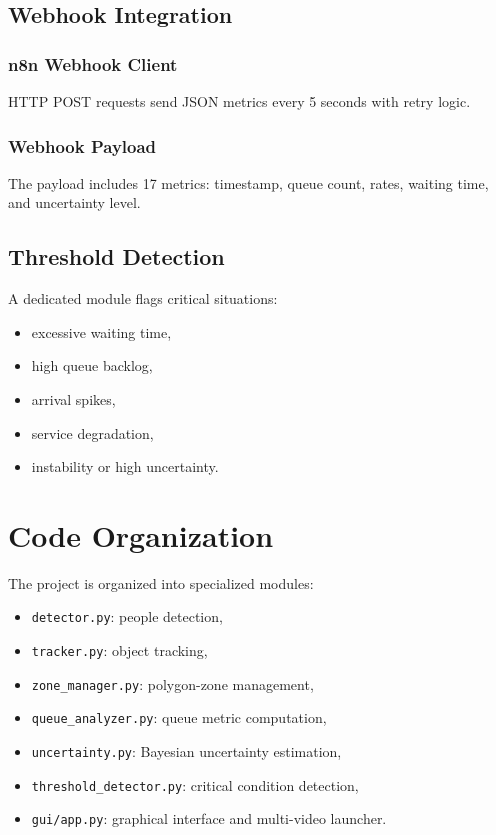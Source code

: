 \subsection{Webhook Integration}
\subsubsection{n8n Webhook Client}
HTTP POST requests send JSON metrics every 5 seconds with retry logic.

\subsubsection{Webhook Payload}
The payload includes 17 metrics: timestamp, queue count, rates, waiting time, and uncertainty level.

\subsection{Threshold Detection}
A dedicated module flags critical situations:
\begin{itemize}
    \item excessive waiting time,
    \item high queue backlog,
    \item arrival spikes,
    \item service degradation,
    \item instability or high uncertainty.
\end{itemize}

\section{Code Organization}
The project is organized into specialized modules:
\begin{itemize}
    \item \texttt{detector.py}: people detection,
    \item \texttt{tracker.py}: object tracking,
    \item \texttt{zone\_manager.py}: polygon-zone management,
    \item \texttt{queue\_analyzer.py}: queue metric computation,
    \item \texttt{uncertainty.py}: Bayesian uncertainty estimation,
    \item \texttt{threshold\_detector.py}: critical condition detection,
    \item \texttt{gui/app.py}: graphical interface and multi-video launcher.
\end{itemize}
\label{sec:code_org}

